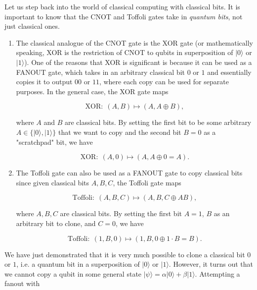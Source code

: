 \documentclass{article}
\theoremstyle{definition}
\begin{document}
    Let us step back into the world of classical computing with classical bits. It is important to know that the CNOT and Toffoli gates take in \textit{quantum bits}, not just classical ones.

    \begin{enumerate}
      \item The classical analogue of the CNOT gate is the XOR gate (or mathematically speaking, XOR is the restriction of CNOT to qubits in superposition of $|0\rangle$ or $|1\rangle$). One of the reasons that XOR is significant is because it can be used as a FANOUT gate, which takes in an arbitrary classical bit $0$ or $1$ and essentially copies it to output $00$ or $11$, where each copy can be used for separate purposes. In the general case, the XOR gate maps

        \[\text{XOR}: \; (A, B) \mapsto (A, A \oplus B),\]

      where $A$ and $B$ are classical bits. By setting the first bit to be some arbitrary $A \in \{|0\rangle, |1\rangle\}$ that we want to copy and the second bit $B = 0$ as a "scratchpad" bit, we have 

        \[\text{XOR}: \; (A, 0) \mapsto (A, A \oplus 0 = A).\]

      \item The Toffoli gate can also be used as a FANOUT gate to copy classical bits since given classical bits $A, B, C$, the Toffoli gate maps 

        \[\text{Toffoli}: \; (A, B, C) \mapsto (A, B, C \oplus A B),\]

      where $A, B, C$ are classical bits. By setting the first bit $A = 1$, $B$ as an arbitrary bit to clone, and $C=0$, we have 

        \[\text{Toffoli}: \; (1, B, 0) \mapsto (1, B, 0 \oplus 1\cdot B = B).\]
    \end{enumerate}

    We have just demonstrated that it is very much possible to clone a classical bit $0$ or $1$, i.e. a quantum bit in a superposition of $|0\rangle$ or $|1\rangle$. However, it turns out that we cannot copy a qubit in some general state $|\psi\rangle = \alpha |0\rangle + \beta |1\rangle$. Attempting a fanout with
\end{document}
